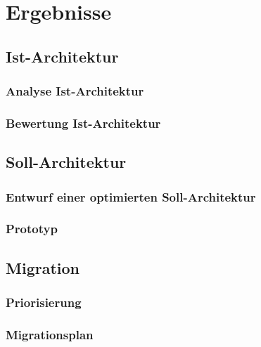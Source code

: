 \chapter{Ergebnisse}

\section{Ist-Architektur}
\subsection{Analyse Ist-Architektur}
\subsection{Bewertung Ist-Architektur}

\section{Soll-Architektur}
\subsection{Entwurf einer optimierten Soll-Architektur}
\subsection{Prototyp}

\section{Migration}
\subsection{Pri­o­ri­sie­rung}
\subsection{Migrationsplan}
